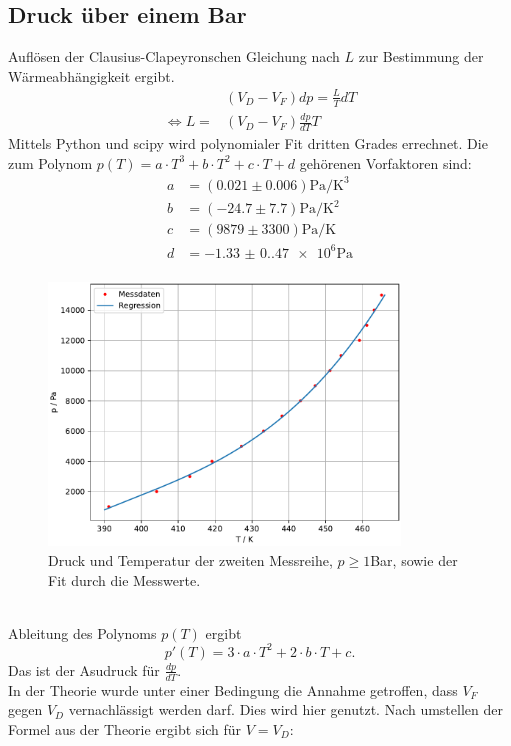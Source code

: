 \subsection{Druck über einem Bar}
Auflösen der Clausius-Clapeyronschen Gleichung nach $L$ zur Bestimmung der Wärmeabhängigkeit ergibt.\\
\begin{align}
  &(V_D-V_F)dp=\frac{L}{T}dT\nonumber\\
  \Leftrightarrow L=&(V_D-V_F)\frac{dp}{dT}T\label{eqn:L(V,T)}
\end{align}
Mittels Python und scipy wird polynomialer Fit dritten Grades errechnet. Die 
zum Polynom $p(T)=a\cdot T^3+b\cdot T^2+c\cdot T+d$ gehörenen Vorfaktoren sind:
\begin{align*}
  a &= (0.021 ± 0.006)\si{\pascal\per\kelvin\cubed}\\
  b &= (-24.7 ± 7.7)\si{\pascal\per\kelvin\squared}\\
  c &= (9879 ± 3300)\si{\pascal\per\kelvin}\\
  d &= \num{-1.33(0.47)e6}\si{\pascal}\\
\end{align*}
\begin{figure}[h]
\centering
\includegraphics[height=7cm]{plotd.pdf}
\caption{Druck und Temperatur der zweiten Messreihe, $p\geq 1$Bar, sowie 
der Fit durch die Messwerte.}
\label{fig:Druck_groß}
\end{figure}
\\
Ableitung des Polynoms $p(T)$ ergibt
\begin{equation}
p'(T)=3\cdot a\cdot T^2+2\cdot b\cdot T+c.
\end{equation}
Das ist der Asudruck für $\frac{dp}{dT}$.\\
In der Theorie wurde unter einer Bedingung die Annahme getroffen, dass $V_F$ gegen $V_D$
vernachlässigt werden darf. Dies wird hier genutzt. Nach umstellen der Formel aus der Theorie ergibt sich für $V=V_D$:
